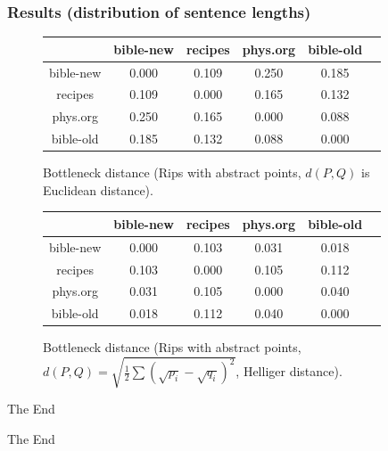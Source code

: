 \documentclass[unknownkeysallowed]{beamer}
\begin{document}
\begin{frame}
\frametitle{Results (distribution of sentence lengths)}

\begin{figure}
\begin{tabular}{ c c c c c c }
	& bible-new & recipes & phys.org & bible-old \\
  	\hline 
  bible-new   & 0.000 & 0.109 & 0.250 & 0.185\\
  recipes     & 0.109 & 0.000 & 0.165 & 0.132\\
  phys.org    & 0.250 & 0.165 & 0.000 & 0.088\\
  bible-old   & 0.185 & 0.132 & 0.088 & 0.000\\
\end{tabular}
\caption{Bottleneck distance (Rips with abstract points,  
$d(P,Q)$ is Euclidean distance).}
\end{figure}

\begin{figure}
\begin{tabular}{ c c c c c c }
	& bible-new & recipes & phys.org & bible-old \\
  	\hline
    bible-new   &0.000 & 0.103 & 0.031 & 0.018 \\
    recipes     &0.103 & 0.000 & 0.105 & 0.112 \\
    phys.org    &0.031 & 0.105 & 0.000 & 0.040 \\
    bible-old   &0.018 & 0.112 & 0.040 & 0.000 \\
\end{tabular}
\caption{Bottleneck distance (Rips with abstract points, 
$d(P,Q) = \sqrt{\frac{1}{2}\sum \left ( \sqrt{p_i} - \sqrt{q_i}\right )^2 }$, Helliger distance).}
\end{figure}

\end{frame}

\begin{frame}{The End}
\Huge{\centerline{The End}}
\end{frame}

\end{document}
